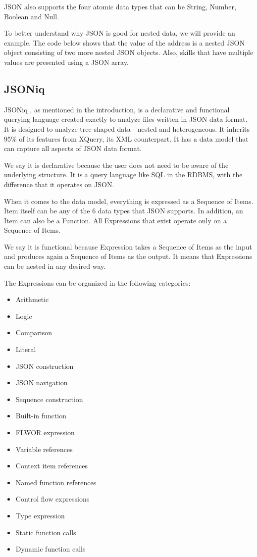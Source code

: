 JSON also supports the four atomic data types that can be String, Number, Boolean and Null.

To better understand why JSON is good for nested data, we will provide an example. The code below shows that the value of the address is a nested JSON object consisting of two more nested JSON objects. Also, skills that have multiple values are presented using a JSON array.



\subsection{JSONiq}
\label{sec:JSONiq}
JSONiq \cite{JSONiqPaper}, as mentioned in the introduction, is a declarative and functional querying language created exactly to analyze files written in JSON data format. It is designed to analyze tree-shaped data - nested and heterogeneous. It inherits 95\% of its features from XQuery, its XML counterpart. It has a data model that can capture all aspects of JSON data format. 

We say it is declarative because the user does not need to be aware of the underlying structure. It is a query language like SQL in the RDBMS, with the difference that it operates on JSON.

When it comes to the data model, everything is expressed as a Sequence of Items. Item itself can be any of the 6 data types that JSON supports. In addition, an Item can also be a Function. All Expressions that exist operate only on a Sequence of Items. 

We say it is functional because Expression takes a Sequence of Items as the input and produces again a Sequence of Items as the output. It means that Expressions can be nested in any desired way.

The Expressions can be organized in the following categories:
\begin{multicols}{2}
	\begin{itemize}
		\item Arithmetic
		\item Logic
		\item Comparison
		\item Literal
		\item JSON construction
		\item JSON navigation
		\item Sequence construction
		\item Built-in function
		\item FLWOR expression
		\item Variable references
		\item Context item references
		\item Named function references
		\item Control flow expressions
		\item Type expression
		\item Static function calls
		\item Dynamic function calls
	\end{itemize}
\end{multicols}

